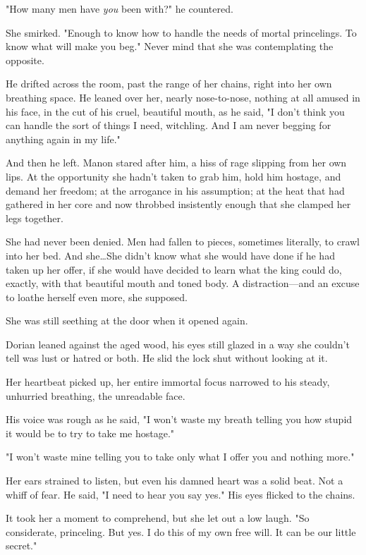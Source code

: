 "How many men have \emph{you} been with?"
he countered.

She smirked.
"Enough to know how to handle the needs of mortal princelings.
To know what will make you beg."
Never mind that she was contemplating the opposite.

He drifted across the room, past the range of her chains, right into her own breathing space.
He leaned over her, nearly nose-to-nose, nothing at all amused in his face, in the cut of his cruel, beautiful mouth, as he said, "I don't think you can handle the sort of things I need, witchling.
And I am never begging for anything again in my life."

And then he left.
Manon stared after him, a hiss of rage slipping from her own lips.
At the opportunity she hadn't taken to grab him, hold him hostage, and demand her freedom; at the arrogance in his assumption; at the heat that had gathered in her core and now throbbed insistently enough that she clamped her legs together.

She had never been denied.
Men had fallen to pieces, sometimes literally, to crawl into her bed.
And she\ldots She didn't know what she would have done if he had taken up her offer, if she would have decided to learn what the king could do, exactly, with that beautiful mouth and toned body.
A distraction---and an excuse to loathe herself even more, she supposed.

She was still seething at the door when it opened again.

Dorian leaned against the aged wood, his eyes still glazed in a way she couldn't tell was lust or hatred or both.
He slid the lock shut without looking at it.

Her heartbeat picked up, her entire immortal focus narrowed to his steady, unhurried breathing, the unreadable face.

His voice was rough as he said, "I won't waste my breath telling you how stupid it would be to try to take me hostage."

"I won't waste mine telling you to take only what I offer you and nothing more."

Her ears strained to listen, but even his damned heart was a solid beat.
Not a whiff of fear.
He said, "I need to hear you say yes."
His eyes flicked to the chains.

It took her a moment to comprehend, but she let out a low laugh.
"So considerate, princeling.
But yes.
I do this of my own free will.
It can be our little secret."


